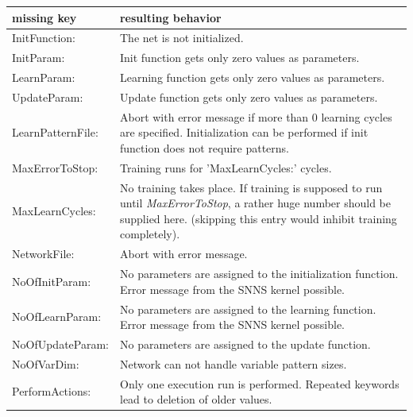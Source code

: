 {\newpage
\clearpage
\samepage \begin{tabular}{|l|p{90mm}|}
\hline

missing key             &resulting behavior\\  \hline \hline

InitFunction:           &The net is not initialized.\\ 

InitParam:              &Init function gets only zero values as parameters.\\  

LearnParam:             &Learning function gets only zero values as
                        parameters.\\  

UpdateParam:            &Update function gets only zero values as
                        parameters.\\  

LearnPatternFile:       &Abort with error message if more than 0
                        learning cycles are specified. Initialization
                        can be performed if init function does not
                        require patterns.\\ 

MaxErrorToStop:         &Training runs for 'MaxLearnCycles:' cycles.\\ 

MaxLearnCycles:         &No training takes place. If training is
supposed to run until {\sl MaxErrorToStop}, a rather huge number
should be supplied here. (skipping this entry would inhibit training
completely).\\   

NetworkFile:            &Abort with error message.\\ 

NoOfInitParam:          &No parameters are assigned to the
                        initialization function. 
                        Error message from the SNNS kernel possible.\\ 
NoOfLearnParam:         &No parameters are assigned to the learning function.
                        Error message from the SNNS kernel possible.\\ 

NoOfUpdateParam:        &No parameters are assigned to the update function.\\ 

NoOfVarDim:             &Network can not handle variable pattern sizes.\\ 
PerformActions:         &Only one execution run is performed. Repeated
keywords lead to deletion of older values.\\ 


\end{tabular}}
